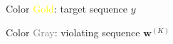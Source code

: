 \documentclass{beamer}
\let\tempone\itemize
\let\temptwo\enditemize
\renewenvironment{itemize}{\tempone\addtolength{\itemsep}{0.5\baselineskip}}{\temptwo}
\newcommand{\air}{\vspace{0.25cm}}
\newcommand{\wvec}{\mathbf{w}}
\newcommand{\cvec}{\mathbf{c}}
\begin{document}
\begin{frame}[fragile]
\begin{center}
\begin{tikzpicture}[transform canvas = {scale=0.8}]
\end{tikzpicture}
  \end{center}  

  \air 
  \air 

  \begin{itemize}
  \item Color \textcolor{yellow}{Gold}: target sequence $y$
  \item Color \textcolor{gray}{Gray}: violating sequence $\wvec^{(K)}$
  \end{itemize}
\end{frame}
\end{document}
